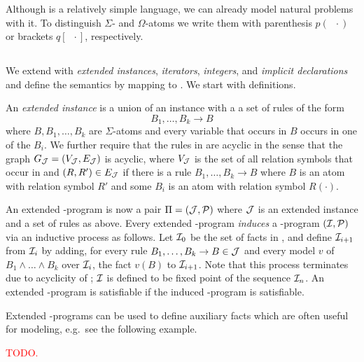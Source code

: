 \documentclass[conference]{IEEEtran}
\begin{document}
{\color{red} Although \bcore is a relatively simple language, we can
already model natural problems with it. To distinguish $\Sigma$- and
$\Omega$-atoms we write them with parenthesis $p(\;\;\cdot)$ or brackets
$q[\;\;\cdot]$,
respectively.


\begin{example}
  
\end{example}

}


\subsection{\bfull}

We extend \bcore with \emph{extended instances}, \emph{iterators},
\emph{integers}, and \emph{implicit declarations} and define the
semantics by mapping to \bcore. We start with definitions. 

An \emph{extended instance \Jmc} is a union of an instance \Imc with a
a set of rules of the form
%
\[B_1,\ldots,B_k\rightarrow B\]
%
where $B,B_1,\ldots,B_k$ are $\Sigma$-atoms and every variable that
occurs in $B$ occurs in one of the $B_i$. We further require that the
rules in \Jmc are acyclic in the sense that the graph $G_\mathcal{J} = (V_\mathcal{J},E_\mathcal{J})$ is
acyclic, where $V_\mathcal{J}$ is the set of all relation symbols that occur in
\Jmc and $(R,R')\in E_\mathcal{J}$ if there is a rule
$B_1,\ldots,B_k\rightarrow B$ where $B$ is an atom with relation
symbol $R'$ and some $B_i$ is an atom with relation symbol $R(\cdot)$.  

An extended \bcore-program is now a pair $\Pi=(\mathcal{J},\mathcal{P})$ where
$\mathcal{J}$ is an extended instance and \Pmc a set of rules as above. Every
extended \bcore-program \emph{induces} a \bcore-program $(\mathcal{I},\mathcal{P})$
via an inductive process as follows. Let $\mathcal{I}_0$ be the set of facts
in \Jmc, and define $\mathcal{I}_{i+1}$ from $\mathcal{I}_i$ by adding, for every
rule $B_1,\ldots,B_k\rightarrow B\in \mathcal{J}$ and every model $v$ of
$B_1\wedge \ldots \wedge B_k$ over $\mathcal{I}_i$, the fact $v(B)$ to
$\mathcal{I}_{i+1}$. Note that this process terminates due to acyclicity of
\Jmc; $\mathcal{I}$ is defined to be fixed point of the sequence $\mathcal{I}_n$. An
extended \bcore-program is satisfiable if the induced \bcore-program
is satisfiable. 

Extended \bcore-programs can be used to define auxiliary facts which
are often useful for modeling, e.g.~see the following example. 
%
\begin{example}
  \textcolor{red}{TODO.}
\end{example}
\end{document}
